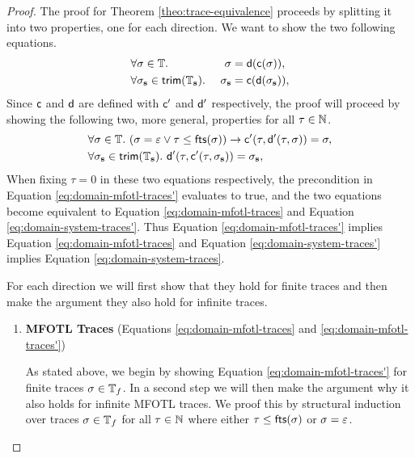 \begin{proof}
    \label{proof:trace-equivalence}
    The proof for Theorem \ref{theo:trace-equivalence}
    proceeds by splitting it into two properties, one
    for each direction.
    We want to show the two following equations.
    \begin{align}
        \label{eq:domain-mfotl-traces}
        &\forall \sigma \in \mathbb{T} .~
        &\sigma
        &=\mathsf{d}(\mathsf{c}(\sigma)), \\
        \label{eq:domain-system-traces}
        &\forall \sigma_{\mathbf{s}} \in \mathsf{trim}(\mathbb{T}_{\mathbf{s}}) .~
        &\sigma_{\mathbf{s}} 
        &=\mathsf{c}(\mathsf{d}(\sigma_{\mathbf{s}})),
    \end{align}
    Since $\mathsf{c}$ and $\mathsf{d}$ are defined with
    $\mathsf{c}'$ and $\mathsf{d}'$ respectively,
    the proof will proceed by showing the following
    two, more general, properties
    for all $\tau \in \mathbb{N}$.
    \begin{align}
        \label{eq:domain-mfotl-traces'}
        &\forall \sigma \in \mathbb{T} .~
        ( \sigma = \varepsilon \vee  \tau \leq \mathsf{fts}(\sigma) )
        \to 
        \mathsf{c}'(\tau, \mathsf{d}'(\tau, \sigma)) = \sigma, \\
        \label{eq:domain-system-traces'}
        &\forall \sigma_{\mathbf{s}} \in \mathsf{trim}(\mathbb{T}_{\mathbf{s}}) .~
        \mathsf{d}'(\tau, \mathsf{c}'(\tau, \sigma_{\mathbf{s}})) = \sigma_{\mathbf{s}},
    \end{align}
    When fixing $\tau=0$ in these two equations respectively,
    the precondition in Equation \ref{eq:domain-mfotl-traces'}
    evaluates to true, and the two equations become
    equivalent to Equation \ref{eq:domain-mfotl-traces}
    and Equation \ref{eq:domain-system-traces'}.
    Thus Equation \ref{eq:domain-mfotl-traces'} implies
    Equation \ref{eq:domain-mfotl-traces} and
    Equation \ref{eq:domain-system-traces'} implies
    Equation \ref{eq:domain-system-traces}.

    For each direction we will first show that they
    hold for finite traces and then make the argument
    they also hold for infinite traces.

    \begin{enumerate}
        \item \textbf{MFOTL Traces}
            (Equations \ref{eq:domain-mfotl-traces} and
            \ref{eq:domain-mfotl-traces'})
        
        As stated above, we begin by showing Equation
        \ref{eq:domain-mfotl-traces'} for finite traces
        $\sigma \in \mathbb{T}_f$.
        In a second step we will then make the argument why it
        also holds for infinite MFOTL traces.
        We proof this by structural induction over traces $\sigma \in \mathbb{T}_f$
        for all $\tau \in \mathbb{N}$ where either $\tau \leq \mathsf{fts}(\sigma)$ or
        $\sigma = \varepsilon$.
    

\end{enumerate}
\end{proof}

